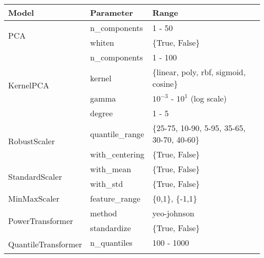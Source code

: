 \centering
\begin{tabular}{@{}l>{\ttfamily}lp{}@{}}
\toprule
\textbf{Model}                       & \textbf{Parameter}                & \textbf{Range}                           \\ \midrule
\multirow{2}{*}{PCA}                 & n\_components                     & 1 - 50                                   \\ \cmidrule{2-3}
                                     & whiten                            & \{True, False\}                          \\ \midrule
\multirow{4}{*}{KernelPCA}           & n\_components                     & 1 - 100                                  \\ \cmidrule{2-3}
                                     & kernel                            & \{linear, poly, rbf, sigmoid, cosine\}   \\ \cmidrule{2-3}
                                     & gamma                             & $10^{-3}$ - $10^{1}$ (log scale)         \\ \cmidrule{2-3}
                                     & degree                            & 1 - 5                                    \\ \midrule
\multirow{2}{*}{RobustScaler}        & quantile\_range                   & \{25-75, 10-90, 5-95, 35-65, 30-70, 40-60\} \\ \cmidrule{2-3}
                                     & with\_centering                   & \{True, False\}                          \\ \midrule
\multirow{2}{*}{StandardScaler}      & with\_mean                        & \{True, False\}                          \\ \cmidrule{2-3}
                                     & with\_std                         & \{True, False\}                          \\ \midrule
MinMaxScaler                         & feature\_range                    & \{0,1\}, \{-1,1\}                        \\ \midrule
\multirow{2}{*}{PowerTransformer}    & method                            & yeo-johnson                              \\ \cmidrule{2-3}
                                     & standardize                       & \{True, False\}                          \\ \midrule
\multirow{3}{*}{QuantileTransformer} & n\_quantiles                      & 100 - 1000                               \\ \cmidrule{2-3}

\end{tabular}
